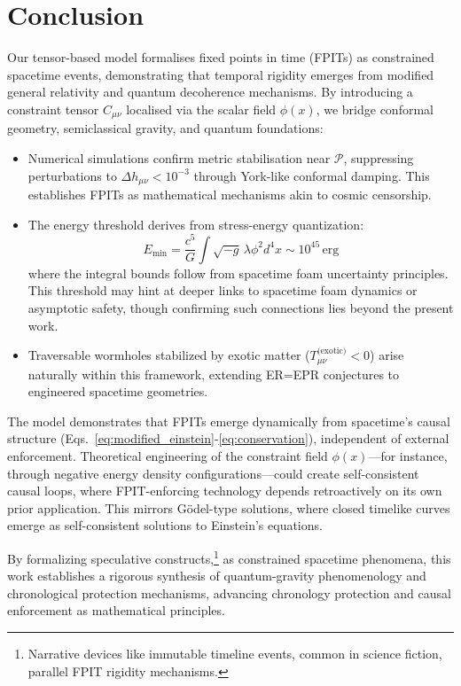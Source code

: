 \documentclass[twocolumn]{article}
\newcommand{\fpit}{\mathcal{P}}
\begin{document}
	\section{Conclusion}
	Our tensor-based model formalises fixed points in time (FPITs) as constrained spacetime events, demonstrating that temporal rigidity emerges from modified general relativity and quantum decoherence mechanisms. By introducing a constraint tensor \(C_{\mu\nu}\) localised via the scalar field \(\phi(x)\), we bridge conformal geometry, semiclassical gravity, and quantum foundations:  
	\begin{itemize}
		\item Numerical simulations confirm metric stabilisation near \(\fpit\), suppressing perturbations to \(\Delta h_{\mu\nu} < 10^{-3}\) through York-like conformal damping\cite{york1972}. This establishes FPITs as mathematical mechanisms akin to cosmic censorship.
		\item The energy threshold derives from stress-energy quantization\cite{FordRoman1996,Fewster2015}:  
		\begin{equation}
			E_{\text{min}} = \frac{c^5}{G} \int \sqrt{-g} \, \lambda \phi^2 d^4x \sim 10^{45} \, \text{erg}
		\end{equation}
		where the integral bounds follow from spacetime foam uncertainty principles\cite{wheeler1957}. This threshold may hint at deeper links to spacetime foam dynamics\cite{wheeler1957} or asymptotic safety\cite{Reuter1998}, though confirming such connections lies beyond the present work.
		\item Traversable wormholes stabilized by exotic matter (\(T_{\mu\nu}^{\text{(exotic)}} < 0\)) arise naturally within this framework, extending ER=EPR conjectures\cite{Maldacena2013} to engineered spacetime geometries.
	\end{itemize}
	
	The model demonstrates that FPITs emerge dynamically from spacetime’s causal structure (Eqs.~\ref{eq:modified_einstein}-\ref{eq:conservation}), independent of external enforcement. Theoretical engineering of the constraint field \(\phi(x)\)—for instance, through negative energy density configurations\cite{ford2000}—could create self-consistent causal loops, where FPIT-enforcing technology depends retroactively on its own prior application. This mirrors Gödel-type solutions, where closed timelike curves emerge as self-consistent solutions to Einstein’s equations\cite{godel1949}.
	
By formalizing speculative constructs,\footnote{Narrative devices like immutable timeline events, common in science fiction, parallel FPIT rigidity mechanisms.} as constrained spacetime phenomena, this work establishes a rigorous synthesis of quantum-gravity phenomenology and chronological protection mechanisms, advancing chronology protection and causal enforcement as mathematical principles.
	
\end{document}
